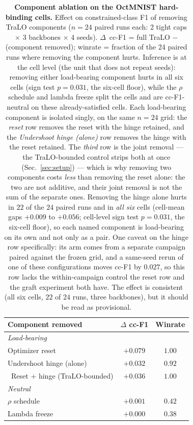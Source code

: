 \begin{table}[t]\centering\small
\caption{
{\textbf{Component ablation on the OctMNIST hard-binding cells.} Effect on constrained-class F1 of removing TraLO components}
($n{=}24$ paired runs each: 2 tight caps $\times$ 3 backbones $\times$ 4 seeds). $\Delta$~cc-F1 = full TraLO $-$ (component removed); winrate = fraction of the 24 paired runs where removing the component hurts. Inference is at the cell level (the unit that does not repeat seeds): removing either load-bearing component hurts in all six cells (sign test $p{=}0.031$, the six-cell floor), while the $\rho$ schedule and lambda freeze split the cells and are cc-F1-neutral on these already-satisfied cells. 
{Each load-bearing component is isolated singly, on the same $n{=}24$ grid:
the \emph{reset} row removes the reset with the hinge retained, and the
\emph{Undershoot hinge (alone)} row removes the hinge with the reset retained.
The \emph{third} row is the joint removal --- the TraLO-bounded control strips both at once
(Sec.~\ref{sec:setup}) --- which is why removing two components costs \emph{less} than
removing the reset alone: the two are not additive, and their joint removal is not the
sum of the separate ones. Removing the hinge alone hurts in $22$ of the $24$
paired runs and in \emph{all six} cells (cell-mean gaps $+0.009$ to $+0.056$; cell-level
sign test $p{=}0.031$, the six-cell floor), so each named component is load-bearing on its
own and not only as a pair. One caveat on the hinge row specifically: its arm comes from a separate campaign paired against the frozen grid, and a same-seed rerun of one of these configurations moves cc-F1 by $0.027$, so this row lacks the within-campaign control the reset row and the graft experiment both have. The effect is consistent (all six cells, $22$ of $24$ runs, three backbones), but it should be read as provisional.}}
\label{tab:ablation_complete}
\begin{tabular}{l c c}
\toprule
Component removed & $\Delta$ cc-F1 & Winrate \\
\midrule
\multicolumn{3}{l}{\emph{Load-bearing}} \\
Optimizer reset   & $+0.079$ & $1.00$ \\
{Undershoot hinge (alone)} & {$+0.032$} & {$0.92$} \\
\ {Reset $+$ hinge (TraLO-bounded)}  & $+0.036$ & $1.00$ \\
\midrule
\multicolumn{3}{l}{\emph{Neutral}} \\
$\rho$ schedule   & $+0.001$ & $0.42$ \\
Lambda freeze     & $+0.000$ & $0.38$ \\
\bottomrule
\end{tabular}
\end{table}
